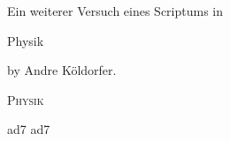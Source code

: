 \begin{center}
Ein weiterer Versuch eines Scriptums in
\end{center}
{\scshape%
\begin{center}
  Physik
\end{center}
}
by Andre K\"oldorfer.
\pagebreak
\begin{center}
  {\Large\scshape%
    Physik
  }
\end{center}
{\tiny\docVers\textcopyright{}ad7}
{\fontsize{1mm}{2mm}\selectfont\docVers\textcopyright{}ad7}
